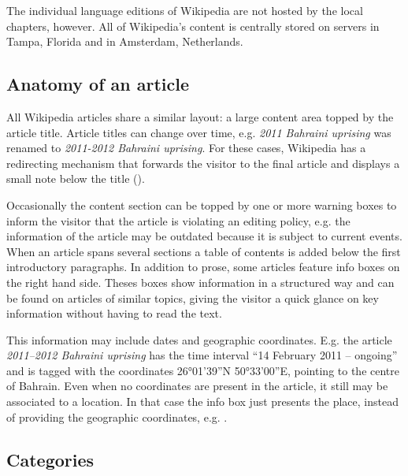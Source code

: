 The individual language editions of Wikipedia are not hosted by the local chapters, however.
All of Wikipedia's content is centrally stored on servers in Tampa, Florida and in Amsterdam, Netherlands.\cite{wmf}

\subsection{Anatomy of an article}\label{sub:article}

All Wikipedia articles share a similar layout: a large content area topped by the article title.
Article titles can change over time, e.g. \emph{2011 Bahraini uprising} was renamed to \emph{2011-2012 Bahraini uprising}. 
For these cases, Wikipedia has a redirecting mechanism that forwards the visitor to the final article and displays a small note below the title ().


Occasionally the content section can be topped by one or more warning boxes to inform the visitor that the article is violating an editing policy, e.g. the information of the article may be outdated because it is subject to current events.
When an article spans several sections a table of contents is added below the first introductory paragraphs.
In addition to prose, some articles feature info boxes on the right hand side.
Theses boxes show information in a structured way and can be found on articles of similar topics, giving the visitor a quick glance on key information without having to read the text.

This information may include dates and geographic coordinates.
E.g. the article \emph{2011--2012 Bahraini uprising} has the time interval ``14 February 2011 – ongoing'' and is tagged with the coordinates 26°01'39''N 50°33'00''E, pointing to the centre of Bahrain.
Even when no coordinates are present in the article, it still may be associated to a location.
In that case the info box just presents the place, instead of providing the geographic coordinates, e.g. . 

\subsection{Categories}\label{sub:categories}

